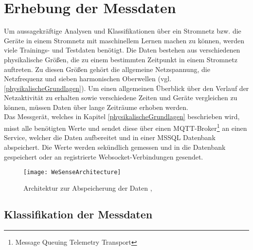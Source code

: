 
\section{Erhebung der Messdaten} \label{Messdaten}

    Um aussagekräftige Analysen und Klassifikationen über ein Stromnetz bzw. die Geräte in einem Stromnetz mit maschinellem Lernen machen zu können, werden viele Trainings- und Testdaten benötigt.
    Die Daten bestehen aus verschiedenen physikalische Größen, die zu einem bestimmten Zeitpunkt in einem Stromnetz auftreten.
    Zu diesen Größen gehört die allgemeine Netzspannung, die Netzfrequenz und sieben harmonischen Oberwellen (vgl. \ref{physikalischeGrundlagen}).
    Um einen allgemeinen Überblick über den Verlauf der Netzaktivität zu erhalten sowie verschiedene Zeiten und Geräte vergleichen zu können, müssen Daten über lange Zeiträume erhoben werden.\\
    \newline
    Das Messgerät, welches in Kapitel \ref{physikalischeGrundlagen} beschrieben wird, misst alle benötigten Werte und sendet diese über einen MQTT-Broker\footnote{Message Queuing Telemetry Transport} an einen Service, welcher die Daten aufbereitet und in einer MSSQL Datenbank abspeichert.
    Die Werte werden sekündlich gemessen und in die Datenbank gespeichert oder an registrierte Websocket-Verbindungen gesendet.
    \newline

    \begin{figure}[h]
        \centering
        \texttt{[image: WeSenseArchitecture]}
        \caption{Architektur zur Abspeicherung der Daten \protect\cite{DrawIO}, \protect\cite{Tensorflow}}
        \label{fig:ArchitectureWesense}
    \end{figure}

    \subsection*{Klassifikation der Messdaten}\label{KlassifikationDerMessdaten}

